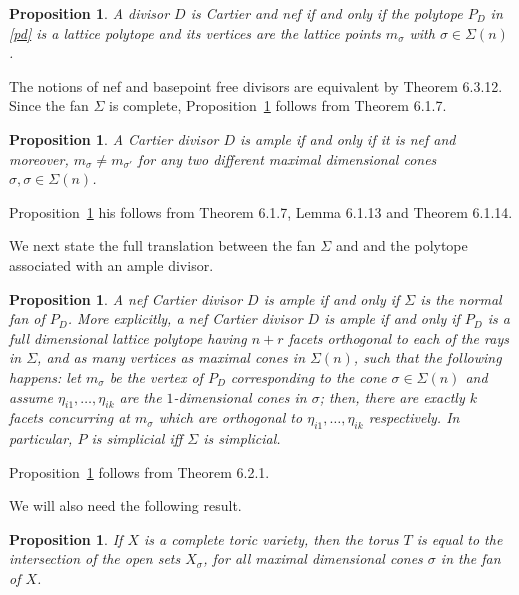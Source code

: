 \documentclass[a4paper,11pt]{amsart}
\newcounter{thm}
\numberwithin{thm}{section}
\numberwithin{equation}{section}
\theoremstyle{definition}
\theoremstyle{plain}
\newtheorem{proposition}[thm]{Proposition}
\begin{document}
\begin{proposition} \label{prop:nef}
 A divisor $D$ is Cartier and nef if and only if the polytope $P_D$ in \eqref{pd} is a lattice polytope and its vertices are the lattice
  points $m_\sigma$ with $\sigma \in \Sigma(n)$.
\end{proposition}

 The notions of nef and basepoint free divisors are equivalent by Theorem 6.3.12.   Since the fan $\Sigma$ is complete, Proposition~\ref{prop:nef} follows from Theorem 6.1.7.


\begin{proposition} \label{prop:ample}
A Cartier divisor $D$ is ample if and only if it is nef and moreover, $m_\sigma \neq m_{\sigma'}$ for any two different maximal 
dimensional cones $\sigma, \sigma \in \Sigma(n)$. 
\end{proposition}

Proposition~\ref{prop:ample} his follows from Theorem 6.1.7, Lemma 6.1.13 and Theorem 6.1.14.  

\smallskip

We next state the full translation between the fan $\Sigma$ and and the polytope associated with an ample divisor.

\begin{proposition}\label{prop:amplefull}
A nef Cartier divisor $D$  is ample if and only if  $\Sigma$ is the normal fan of $P_D$. 
More explicitly, a nef Cartier divisor $D$ is ample if and only if $P_D$ is a full dimensional  lattice polytope having $n+r$  
facets orthogonal to each of the rays in $\Sigma$, and as many vertices as maximal cones in $\Sigma(n)$,  such that 
the following happens: let $m_\sigma$ be the vertex of $P_D$ corresponding to the cone $\sigma \in \Sigma(n)$ 
and assume $\eta_{i1},\dots, \eta_{ik}$ are the $1$-dimensional cones in $\sigma$; then, there are exactly 
$k$ facets  concurring at $m_\sigma$ which are orthogonal to $\eta_{i1}, \dots, \eta_{ik}$ 
respectively. In particular, $P$ is simplicial iff $\Sigma$ is simplicial. 
\end{proposition}

Proposition~\ref{prop:amplefull} follows from Theorem 6.2.1.

\smallskip

We will also need the following result.

\begin{proposition}\label{prop:1}
If $X$ is a complete toric variety, then the torus $T$ is equal to the intersection of the open sets $X_\sigma$, for all maximal dimensional cones $\sigma$ in the fan of $X$.
\end{proposition}
\end{document}
